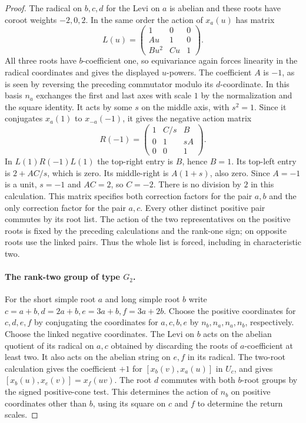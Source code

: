 \documentclass[11pt,a4paper,openany,oneside]{book}
\theoremstyle{resultstyle}
\theoremstyle{definition}
\numberwithin{equation}{chapter}
\begin{document}
\begin{proof}
The radical on \(b,c,d\) for the Levi on \(a\) is abelian
and these roots have coroot weights \(-2,0,2\).
In the same order the action of \(x_a(u)\) has matrix
\[
 L(u)=\begin{pmatrix}
 1&0&0\\ Au&1&0\\ Bu^2&Cu&1
 \end{pmatrix}.
\]
All three roots have \(b\)-coefficient one, so equivariance
again forces linearity in the radical coordinates and
gives the displayed \(u\)-powers. The coefficient \(A\)
is \(-1\), as is seen by reversing the preceding commutator
modulo its \(d\)-coordinate. In this basis \(n_a\) exchanges
the first and last axes with scale \(1\) by the normalization
and the square identity. It acts by some \(s\) on the middle
axis, with \(s^2=1\). Since it conjugates \(x_a(1)\) to
\(x_{-a}(-1)\), it gives the negative action matrix
\[
 R(-1)=\begin{pmatrix}1&C/s&B\\0&1&sA\\0&0&1\end{pmatrix}.
\]
In \(L(1)R(-1)L(1)\) the top-right entry is \(B\), hence
\(B=1\). Its top-left entry is \(2+AC/s\), which is zero.
Its middle-right is \(A(1+s)\), also zero. Since \(A=-1\)
is a unit, \(s=-1\) and \(AC=2\), so \(C=-2\).
There is no division by \(2\) in this calculation.
This matrix specifies both correction factors for the pair
\(a,b\) and the only correction factor for the pair \(a,c\).
Every other distinct positive pair commutes by its root
list. The action of the two representatives on the positive
roots is fixed by the preceding calculations and the
rank-one sign; on opposite roots use the linked pairs.
Thus the whole list is forced, including in characteristic
two.

\paragraph{The rank-two group of type \texorpdfstring{\(G_2\)}{G2}.}
For the short simple root \(a\) and long simple root \(b\)
write \(c=a+b,d=2a+b,e=3a+b,f=3a+2b\).
Choose the positive coordinates for \(c,d,e,f\) by
conjugating the coordinates for \(a,c,b,e\) by
\(n_b,n_a,n_a,n_b\), respectively. Choose the linked
negative coordinates. The Levi on \(b\) acts on the
abelian quotient of its radical on \(a,c\) obtained
by discarding the roots of \(a\)-coefficient at least two.
It also acts on the abelian string on \(e,f\) in its radical.
The two-root calculation gives the coefficient \(+1\)
for \([x_b(v),x_a(u)]\) in \(U_c\), and gives
\([x_b(u),x_e(v)]=x_f(uv)\). The root \(d\)
commutes with both \(b\)-root groups by the signed
positive-cone test. This determines the action of \(n_b\)
on positive coordinates other than \(b\), using its square
on \(c\) and \(f\) to determine the return scales.


\end{proof}
\end{document}
